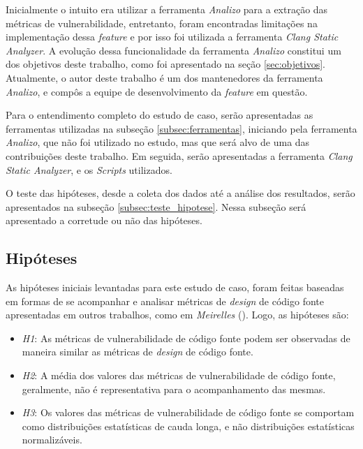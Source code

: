 Inicialmente o intuito era utilizar a ferramenta \emph{Analizo} para a extração
das métricas de vulnerabilidade, entretanto, foram encontradas limitações na
implementação dessa \textit{feature} e por isso foi utilizada a ferramenta
\emph{Clang Static Analyzer}. A evolução dessa funcionalidade da ferramenta
\emph{Analizo} constitui um dos objetivos deste trabalho, como foi apresentado na seção
\ref{sec:objetivos}. Atualmente, o autor deste trabalho é um dos mantenedores da
ferramenta \emph{Analizo}, e compôs a equipe de desenvolvimento da
\textit{feature} em questão.

Para o entendimento completo do estudo de caso, serão apresentadas as
ferramentas utilizadas na subseção \ref{subsec:ferramentas}, iniciando pela ferramenta \emph{Analizo}, que
não foi utilizado no estudo, mas que será alvo de uma das contribuições deste
trabalho. Em seguida, serão apresentadas a ferramenta \emph{Clang Static
Analyzer}, e os \textit{Scripts} utilizados.

O teste das hipóteses, desde a coleta dos dados até a análise dos resultados, serão
apresentados na subseção \ref{subsec:teste_hipotese}. Nessa subseção será
apresentado a corretude ou não das hipóteses.

\subsection{Hipóteses} \label{subsec:hipoteses}

As hipóteses iniciais levantadas para este estudo de caso, foram feitas baseadas em
formas de se acompanhar e analisar métricas de \textit{design} de código fonte
apresentadas em outros trabalhos, como em \emph{Meirelles}
(\citeyear{meirelles2013}). Logo, as hipóteses são:

\begin{itemize}
  \item \textit{H1}: As métricas de vulnerabilidade de código fonte podem ser
    observadas de maneira similar as métricas de \textit{design} de código
    fonte.
  \item \textit{H2}: A média dos valores das métricas de vulnerabilidade de
    código fonte, geralmente, não é representativa para o acompanhamento das mesmas.
  \item \textit{H3}: Os valores das métricas de vulnerabilidade de código fonte
    se comportam como distribuições estatísticas de cauda longa, e não
    distribuições estatísticas normalizáveis.
\end{itemize}


